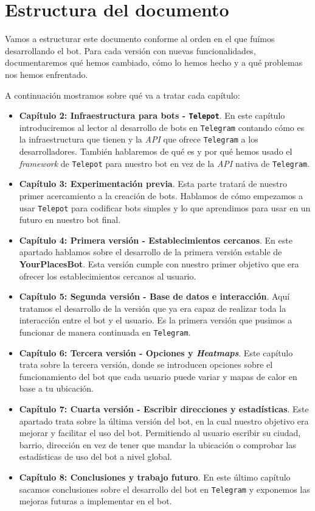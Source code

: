 \documentclass[oneside]{memoir}
\begin{document}
\section{Estructura del documento}
Vamos a estructurar este documento conforme al orden en el que fuímos desarrollando el bot. Para cada versión con nuevas funcionalidades, documentaremos qué hemos cambiado, cómo lo hemos hecho y a qué problemas nos hemos enfrentado.

A continuación mostramos sobre qué va a tratar cada capítulo:

\begin{itemize}
  \item \textbf{Capítulo 2: Infraestructura para bots - \texttt{Telepot}}. En este capítulo introduciremos al lector al desarrollo de bots en \texttt{Telegram} contando cómo es la infraestructura que tienen y la \textit{API} que ofrece \texttt{Telegram} a los desarrolladores. También hablaremos de qué es y por qué hemos usado el \textit{framework} de \texttt{Telepot} para nuestro bot en vez de la \textit{API} nativa de \texttt{Telegram}.
	
  \item \textbf{Capítulo 3: Experimentación previa}. Esta parte tratará de nuestro primer acercamiento a la creación de bots. Hablamos de cómo empezamos a usar \texttt{Telepot} para codificar bots simples y lo que aprendimos para usar en un futuro en nuestro bot final.
	
  \item \textbf{Capítulo 4: Primera versión - Establecimientos cercanos}. En este apartado hablamos sobre el desarrollo de la primera versión estable de \textbf{YourPlacesBot}. Esta versión cumple con nuestro primer objetivo que era ofrecer los establecimientos cercanos al usuario. 
  
  \item \textbf{Capítulo 5: Segunda versión - Base de datos e interacción}. Aquí tratamos el desarrollo de la versión que ya era capaz de realizar toda la interacción entre el bot y el usuario. Es la primera versión que pusimos a funcionar de manera continuada en \texttt{Telegram}.
  
  \item \textbf{Capítulo 6: Tercera versión - Opciones y \textit{Heatmaps}}. Este capítulo trata sobre la tercera versión, donde se introducen opciones sobre el funcionamiento del bot que cada usuario puede variar y mapas de calor en base a tu ubicación.
	
  \item \textbf{Capítulo 7: Cuarta versión - Escribir direcciones y estadísticas}. Este apartado trata sobre la última versión del bot, en la cual nuestro objetivo era mejorar y facilitar el uso del bot. Permitiendo al usuario escribir su ciudad, barrio, dirección en vez de tener que mandar la ubicación o comprobar las estadísticas de uso del bot a nivel global.
  
  \item \textbf{Capítulo 8: Conclusiones y trabajo futuro}. En este último capítulo sacamos conclusiones sobre el desarrollo del bot en \texttt{Telegram} y exponemos las mejoras futuras a implementar en el bot.
\end{itemize}
\end{document}
